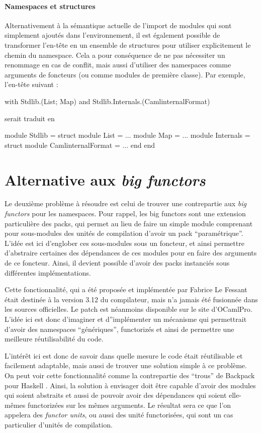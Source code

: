 \documentclass[11pt,a4paper]{report}
\begin{document}
\paragraph{Namespaces et structures}

Alternativement à la sémantique actuelle de l'import de modules qui sont
simplement ajoutés dans l'environnement, il est également possible de
transformer l'en-tête en un ensemble de structures pour utiliser explicitement le
chemin du namespace. Cela a pour conséquence de ne pas nécessiter un renommage
en cas de conflit, mais aussi d'utiliser des namespaces comme arguments de
foncteurs (ou comme modules de première classe). Par exemple, l'en-tête suivant
:
\begin{OCaml}
with Stdlib.(List; Map)
and Stdlib.Internals.(CamlinternalFormat)
\end{OCaml}
serait traduit en
\begin{OCaml}
module Stdlib =
  struct
    module List = ...
    module Map = ...
    module Internals =
      struct
        module CamlinternalFormat = ...
      end
  end
\end{OCaml}

\section{Alternative aux \emph{big functors}}

Le deuxième problème à résoudre est celui de trouver une contrepartie aux
\emph{big functors} pour les namespaces. Pour rappel, les big functors sont une
extension particulière des packs, qui permet au lieu de faire un simple module
comprenant pour sous-modules des unités de compilation d'avoir un pack
``paramétrique''. L'idée est ici d'englober ces sous-modules sous un foncteur, et
ainsi permettre d'abstraire certaines des dépendances de ces modules pour en
faire des arguments de ce foncteur. Ainsi, il devient possible d'avoir des packs
instanciés sous différentes implémentations.

Cette fonctionnalité, qui a été proposée et implémentée par Fabrice Le Fessant
\cite{lefessant-bigfunctors} était destinée à la version 3.12 du compilateur,
mais n'a jamais été fusionnée dans les sources officielles. Le patch est
néanmoins disponible sur le site d'OCamlPro. L'idée ici est donc d'imaginer et
d''implémenter un mécanisme qui permettrait d'avoir des namespaces
``génériques'', functorizés et ainsi de permettre une meilleure réutilisabilité
du code.

L'intérêt ici est donc de savoir dans quelle mesure le code était réutilisable
et facilement adaptable, mais aussi de trouver une solution simple à ce
problème. On peut voir cette fonctionnalité comme la contrepartie des ``trous''
de Backpack pour Haskell \cite{KilpatrickDJM14}. Ainsi, la solution à envisager
doit être capable d'avoir des modules qui soient abstraits et aussi de pouvoir
avoir des dépendances qui soient elle-mêmes functorizées sur les mêmes
arguments. Le résultat sera ce que l'on appelera des \emph{functor units}, ou
aussi des unité functorisées, qui sont un cas particulier d'unités de
compilation.
\end{document}
